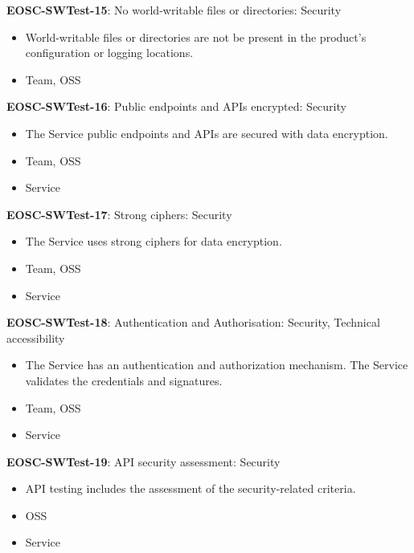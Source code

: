 \textbf{EOSC-SWTest-15}: No world-writable files or directories: Security

\begin{itemize}
    \item World-writable files or directories are not be present in the product's configuration or logging locations. \cite{orviz_set_2017}
    \item Team, OSS
\end{itemize}

\textbf{EOSC-SWTest-16}: Public endpoints and APIs encrypted: Security

\begin{itemize}
    \item The Service public endpoints and APIs are secured with data encryption. \cite{orviz_fernandez_eosc-synergy_2020}
    \item Team, OSS
    \item Service
\end{itemize}

\textbf{EOSC-SWTest-17}: Strong ciphers: Security

\begin{itemize}
    \item The Service uses strong ciphers for data encryption. \cite{orviz_fernandez_eosc-synergy_2020}
    \item Team, OSS
    \item Service
\end{itemize}

\textbf{EOSC-SWTest-18}: Authentication and Authorisation: Security, Technical accessibility

\begin{itemize}
    \item The Service has an authentication and authorization mechanism. The Service validates the credentials and signatures. \cite{shepherdson_cessda_2019,orviz_fernandez_eosc-synergy_2020}
    \item Team, OSS
    \item Service
\end{itemize}

\textbf{EOSC-SWTest-19}: API security assessment: Security

\begin{itemize}
    \item API testing includes the assessment of the security-related criteria. \cite{orviz_fernandez_eosc-synergy_2020}
    \item OSS
    \item Service
\end{itemize}

